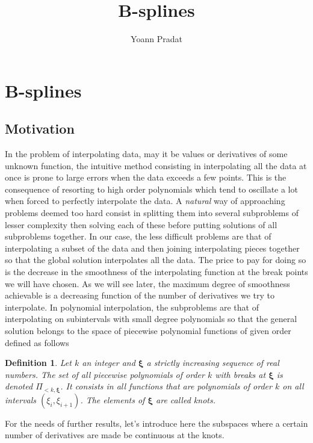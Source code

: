 \documentclass[a4paper, 11pt]{article}
\newtheorem{deftn}{Definition}
\begin{document}
\title{B-splines}
\author{Yoann Pradat}
\maketitle

\section{B-splines}
\subsection{Motivation}

In the problem of interpolating data, may it be values or derivatives of some unknown function, the intuitive method 
consisting in interpolating all the data at once is prone to large errors when the data exceeds a few points. This is 
the consequence of resorting to high order polynomials which tend to oscillate a lot when forced to perfectly 
interpolate the data. A \emph{natural} way of approaching problems deemed too hard consist in splitting them into 
several subproblems of lesser complexity then solving each of these before putting solutions of all subproblems 
together.  In our case, the less difficult problems are that of interpolating a subset of the data and then joining 
interpolating pieces together so that the global solution interpolates all the data. The price to pay for doing so is 
the decrease in the smoothness of the interpolating function at the break points we will have chosen. As we will see 
later, the maximum degree of smoothness achievable is a decreasing function of the number of derivatives we try to 
interpolate. In polynomial interpolation, the subproblems are that of interpolating on subintervals with small degree 
polynomials so that the general solution belongs to the space of piecewise polynomial functions of given order defined 
as follows

\begin{deftn}
  Let $k$ an integer and $\bm{\xi}$ a strictly increasing sequence of real numbers. The set of all piecewise polynomials 
  of order $k$ with breaks at $\bm {\xi}$ is denoted $\Pi_{<k, \bm{\xi}}$. It consists in all functions that are 
  polynomials of order $k$ on all intervals $(\xi_i, \xi_{i+1})$. The elements of $\bm{\xi}$ are called \emph{knots}.
\end{deftn}

For the needs of further results, let's introduce here the subspaces where a certain number of derivatives are made be 
continuous at the knots. 
\end{document}
